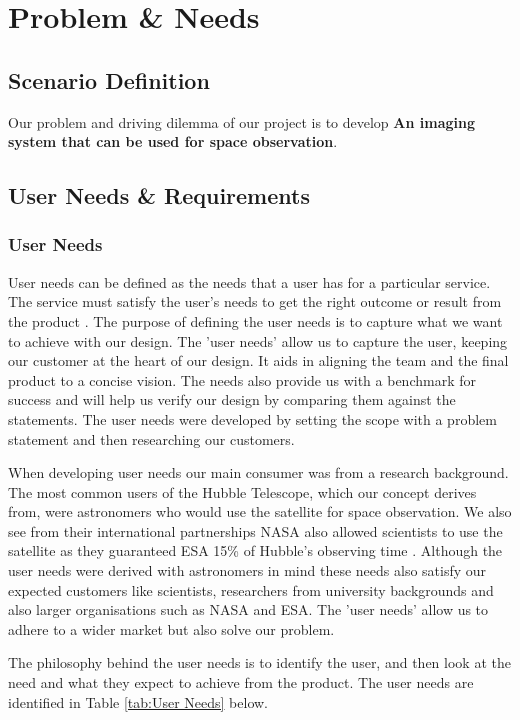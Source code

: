 \section{Problem \& Needs}
\subsection{Scenario Definition}
Our problem and driving dilemma of our project is to develop \textbf{An imaging system that can be used for space observation}. 
\vspace{2mm}

\subsection{User Needs \& Requirements}
\subsubsection{User Needs}
User needs can be defined as the needs that a user has for a particular service. The service must satisfy the user's needs to get the right outcome or result from the product \cite{GOVUK2023}. The purpose of defining the user needs is to capture what we want to achieve with our design. The 'user needs' allow us to capture the user, keeping our customer at the heart of our design. It aids in aligning the team and the final product to a concise vision. The needs also provide us with a benchmark for success and will help us verify our design by comparing them against the statements. The user needs were developed by setting the scope with a problem statement and then researching our customers.
\vspace{1.5mm}

When developing user needs our main consumer was from a research background. The most common users of the Hubble Telescope, which our concept derives from, were astronomers who would use the satellite for space observation. We also see from their international partnerships NASA also allowed scientists to use the satellite as they guaranteed ESA 15\% of Hubble's observing time \cite{NASA2023}. Although the user needs were derived with astronomers in mind these needs also satisfy our expected customers like scientists, researchers from university backgrounds and also larger organisations such as NASA and ESA. The 'user needs' allow us to adhere to a wider market but also solve our problem.
\vspace{1.5mm}

The philosophy behind the user needs is to identify the user, and then look at the need and what they expect to achieve from the product. The user needs are identified in Table \ref{tab:User Needs} below. 

